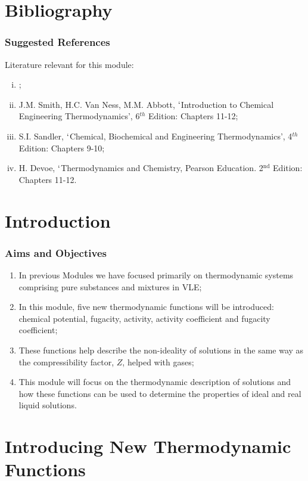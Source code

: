 \documentclass[10pt,compress,unknownkeysallowed]{beamer}
\begin{document}
\section{Bibliography}
\begin{frame}
 \frametitle{Suggested References}
  Literature relevant for this module:
  \begin{enumerate}[(i)]
   \item {};
   \item\label{SVN_Book} J.M. Smith, H.C. Van Ness, M.M. Abbott, $\lq$Introduction to Chemical Engineering Thermodynamics', 6$^{th}$ Edition: Chapters 11-12;
   \item\label{Sandle_Book} S.I. Sandler, $\lq$Chemical, Biochemical and Engineering Thermodynamics', 4$^{th}$ Edition: Chapters 9-10;
   \item H. Devoe, $\lq$Thermodynamics and Chemistry, Pearson Education. 2$^{\text{nd}}$ Edition: Chapters 11-12.
  \end{enumerate}
\end{frame}



\section{Introduction}

\begin{frame}
 \frametitle{Aims and Objectives}
    \begin{enumerate}
        \item<1-> In previous Modules we have focused primarily on thermodynamic systems comprising pure substances and mixtures in VLE;
        \item<1-> In this module, five new thermodynamic functions will be introduced: chemical potential, fugacity, activity, activity coefficient and fugacity coefficient;
        \item<1-> These functions help describe the non-ideality of solutions in the same way as the compressibility factor, $Z$, helped with gases;
        \item<1-> This module will focus on the thermodynamic description of solutions and how these functions can be used to determine the properties of ideal and real liquid solutions. 
   \end{enumerate}
\end{frame}


\section{Introducing New Thermodynamic Functions}
\end{document}
